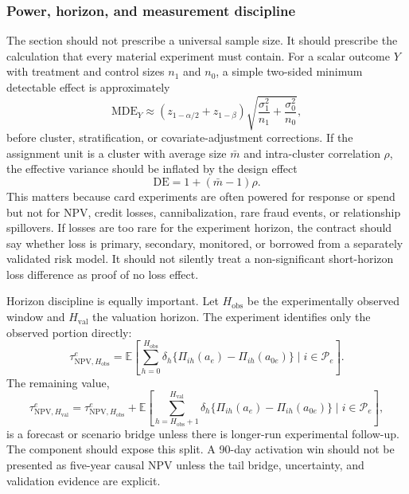 \documentclass[11pt]{article}
\newcommand{\E}{\mathbb{E}}
\newcommand{\NPV}{\mathrm{NPV}}
\newcommand{\1}{\mathbf{1}}
\begin{document}
\subsubsection{Power, horizon, and measurement discipline}

The section should not prescribe a universal sample size. It should prescribe
the calculation that every material experiment must contain. For a scalar
outcome $Y$ with treatment and control sizes $n_1$ and $n_0$, a simple
two-sided minimum detectable effect is approximately
\begin{equation}
  \mathrm{MDE}_Y
  \approx
  (z_{1-\alpha/2}+z_{1-\beta})
  \sqrt{\frac{\sigma_1^2}{n_1}+\frac{\sigma_0^2}{n_0}},
  \label{eq:mde}
\end{equation}
before cluster, stratification, or covariate-adjustment corrections. If the
assignment unit is a cluster with average size $\bar{m}$ and intra-cluster
correlation $\rho$, the effective variance should be inflated by the design
effect
\begin{equation}
  \mathrm{DE}=1+(\bar{m}-1)\rho.
  \label{eq:design-effect}
\end{equation}
This matters because card experiments are often powered for response or spend
but not for NPV, credit losses, cannibalization, rare fraud events, or
relationship spillovers. If losses are too rare for the experiment horizon,
the contract should say whether loss is primary, secondary, monitored, or
borrowed from a separately validated risk model. It should not silently treat a
non-significant short-horizon loss difference as proof of no loss effect.

Horizon discipline is equally important. Let $H_{\mathrm{obs}}$ be the
experimentally observed window and $H_{\mathrm{val}}$ the valuation horizon.
The experiment identifies only the observed portion directly:
\begin{equation}
  \tau^{e}_{\NPV,H_{\mathrm{obs}}}
  =
  \E\!\left[
    \sum_{h=0}^{H_{\mathrm{obs}}}\delta_h
    \{\Pi_{ih}(a_e)-\Pi_{ih}(a_{0e})\}
    \mid i\in\mathcal{P}_e
  \right].
  \label{eq:observed-horizon-npv}
\end{equation}
The remaining value,
\begin{equation}
  \tau^{e}_{\NPV,H_{\mathrm{val}}}
  =
  \tau^{e}_{\NPV,H_{\mathrm{obs}}}
  +
  \E\!\left[
    \sum_{h=H_{\mathrm{obs}}+1}^{H_{\mathrm{val}}}\delta_h
    \{\Pi_{ih}(a_e)-\Pi_{ih}(a_{0e})\}
    \mid i\in\mathcal{P}_e
  \right],
  \label{eq:horizon-bridge}
\end{equation}
is a forecast or scenario bridge unless there is longer-run experimental
follow-up. The component should expose this split. A 90-day activation win
should not be presented as five-year causal NPV unless the tail bridge,
uncertainty, and validation evidence are explicit.
\end{document}
